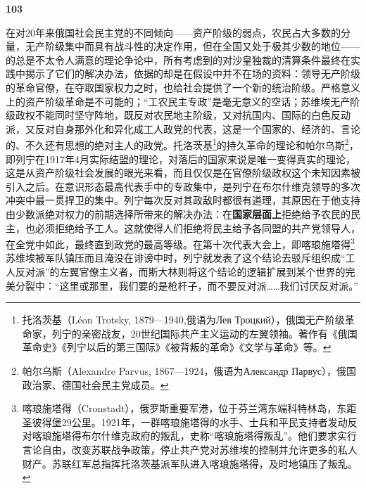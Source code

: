 \documentclass[fontset=fandol, a4paper, 12pt, openright]{ctexbook}
\makeatletter
\newcommand{\thesis}[1]{%
    \par\vspace{1.5em}%
    {\centering \textbf{\Large #1}\par}%
    \nobreak\vspace{0.5em}\nobreak
    \@afterindenttrue %
    \@afterheading    %
}
\makeatother
\begin{document}
\thesis{103}
在对20年来俄国社会民主党的不同倾向——资产阶级的弱点，农民占大多数的分量，无产阶级集中而具有战斗性的决定作用，但在全国又处于极其少数的地位——的总是不太令人满意的理论争论中，所有考虑到的对沙皇独裁的清算条件最终在实践中揭示了它们的解决办法，依据的却是在假设中并不在场的资料：领导无产阶级的革命官僚，在夺取国家权力之时，也给社会提供了一个新的统治阶级。严格意义上的资产阶级革命是不可能的；“工农民主专政”是毫无意义的空话；苏维埃无产阶级政权不能同时坚守阵地，既反对农民地主阶级，又对抗国内、国际的白色反动派，又反对自身那外化和异化成工人政党的代表，这是一个国家的、经济的、言论的、不久还有思想的绝对主人的政党。托洛茨基\footnote{托洛茨基（Léon Trotsky, 1879—1940,俄语为Лев Троцкий），俄国无产阶级革命家，列宁的亲密战友，20世纪国际共产主义运动的左翼领袖。著作有《俄国革命史》《列宁以后的第三国际》《被背叛的革命》《文学与革命》等。}的持久革命的理论和帕尔乌斯\footnote{帕尔乌斯（Alexandre Parvus, 1867—1924，俄语为Александр Парвус），俄国政治家、德国社会民主党成员。}，即列宁在1917年4月实际结盟的理论，对落后的国家来说是唯一变得真实的理论，这是从资产阶级社会发展的眼光来看，而且仅仅是在官僚阶级政权这个未知因素被引入之后。在意识形态最高代表手中的专政集中，是列宁在布尔什维克领导的多次冲突中最一贯捍卫的集中。列宁每次反对其政敌时都很有道理，其原因在于他支持由少数派绝对权力的前期选择所带来的解决办法：在\textbf{国家层面上}拒绝给予农民的民主，也必须拒绝给予工人。这就使得人们拒绝将民主给予各同盟的共产党领导人，在全党中如此，最终直到政党的最高等级。在第十次代表大会上，即喀琅施塔得\footnote{喀琅施塔得（Cronstadt），俄罗斯重要军港，位于芬兰湾东端科特林岛，东距圣彼得堡29公里。1921年，一群喀琅施塔得的水手、士兵和平民支持者发动反对喀琅施塔得布尔什维克政府的叛乱，史称“喀琅施塔得叛乱”。他们要求实行言论自由，改变苏联战争政策，停止共产党对苏维埃的控制并允许更多的私人财产。苏联红军总指挥托洛茨基派军队进入喀琅施塔得，及时地镇压了叛乱。}苏维埃被军队镇压而且淹没在诽谤中时，列宁就发表了这个结论去驳斥组织成“工人反对派”的左翼官僚主义者，而斯大林则将这个结论的逻辑扩展到某个世界的完美分裂中：“这里或那里，我们要的是枪杆子，而不要反对派……我们讨厌反对派。”
\end{document}
